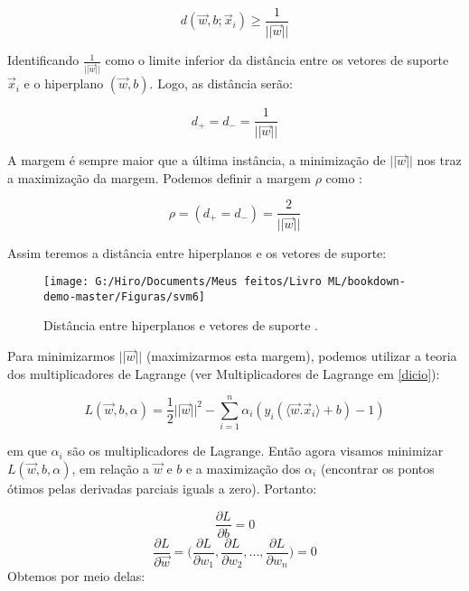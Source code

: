 \documentclass[
  openany]{book}
\begin{document}
\begin{equation}
d(\vec{w},b;\vec{x}_i)\geq \frac{1}{||\vec{w}||}
\label{eq:distcrestri}
\end{equation}

Identificando \(\frac{1}{||\vec{w}||}\) como o limite inferior da distância entre os vetores de suporte \(\vec{x}_i\) e o hiperplano \((\vec{w},b)\). Logo, as distância serão:

\begin{equation}
d_+=d_-=\frac{1}{||\vec{w}||}
\label{eq:distanciamarg}
\end{equation}

A margem é sempre maior que a última instância, a minimização de \(||\vec{w}||\) nos traz a maximização da margem. Podemos definir a margem \(\rho\) como \citep{gonccalves2015maquina}:

\begin{equation}
\rho=(d_+=d_-)=\frac{2}{||\vec{w}||}
\label{eq:margemsvm}
\end{equation}

Assim teremos a distância entre hiperplanos e os vetores de suporte:

\begin{figure}

{\centering \texttt{[image: G:/Hiro/Documents/Meus feitos/Livro ML/bookdown-demo-master/Figuras/svm6]} 

}

\caption{Distância entre hiperplanos e vetores de suporte \citep{gonccalves2015maquina}.}\label{fig:svm6}
\end{figure}



Para minimizarmos \(||\vec{w}||\) (maximizarmos esta margem), podemos utilizar a teoria dos multiplicadores de Lagrange (ver Multiplicadores de Lagrange em \ref{dicio}):

\begin{equation}
L(\vec{w},b,\alpha)=\frac{1}{2}||\vec{w}||^2-\displaystyle \sum^n_{i=1}\alpha_i(y_i(\langle\vec{w}.\vec{x}_i\rangle+b)-1)
\label{eq:lagrangemargem}
\end{equation}

em que \(\alpha_i\) são os multiplicadores de Lagrange. Então agora visamos minimizar \(L(\vec{w},b,\alpha)\), em relação a \(\vec{w}\) e \(b\) e a maximização dos \(\alpha_i\) (encontrar os pontos ótimos pelas derivadas parciais iguals a zero). Portanto:

\[\frac{\partial L}{\partial b}=0\]
\[\frac{\partial L}{\partial \vec{w}}=\bigg(\frac{\partial L}{\partial w_1},\frac{\partial L}{\partial w_2},...,\frac{\partial L}{\partial w_n}\bigg)=0\]
Obtemos por meio delas:
\end{document}
